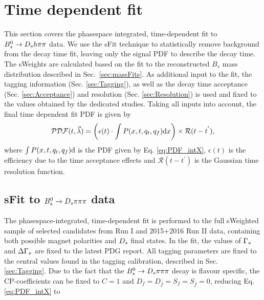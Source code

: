 \section{Time dependent fit}
\label{sec:Tfit}

This section covers the phasespace integrated, time-dependent fit to ${{B}^0_{s}}\rightarrow{\ensuremath{{D}_{s}}}{\ensuremath{h}}{\ensuremath{\pi}}{\ensuremath{\pi}}$ data.
We use the \textsf{sFit} technique \cite{Pivk:2004ty}  to statistically remove background from the decay time fit, leaving only the signal PDF to describe the decay time. 
The \textsf{sWeights} are calculated based on the fit to the reconstructed $B_s$ mass distribution described in Sec.~\ref{sec:massFits}.
As additional input to the fit, the tagging information (Sec. \ref{sec:Tagging}), 
as well as the decay time acceptance (Sec. \ref{sec:Acceptance}) and resolution (Sec. \ref{sec:Resolution}) is used and fixed to the values obtained by the dedicated studies. 
Taking all inputs into account, the final time dependent fit PDF is given by
\begin{equation}
\label{eq:TPDF_full}
\mathcal{PDF}(t,\vec{\lambda}) = \left(\epsilon(t)\cdot \int P(x,t,q_t,q_f) \text d x \right) \times \mathcal{R}(t - t^{'}),
\end{equation}
where $\int P(x,t,q_t,q_f) \text d$ is the PDF given by Eq. \ref{eq:PDF_intX}, $\epsilon(t)$ is the efficiency due to the time acceptance effects and $\mathcal{R}(t - t^{'})$ is the Gaussian time resolution function. 



\subsection{sFit to ${{B}^0_{s}}\rightarrow{\ensuremath{{D}_{s}}}{\ensuremath{\pi}}{\ensuremath{\pi}}{\ensuremath{\pi}}$ data}  
The phasespace-integrated, time-dependent fit is performed to the full sWeighted sample of selected candidates from Run I and 2015+2016 Run II data, containing both possible magnet polarities and ${{D}_{s}}$ final states.
In the fit, the values of ${\Gamma_{{s}}}$ and ${\Delta\Gamma_{{s}}}$ are fixed to the latest PDG report. All tagging parameters are fixed to the central values found in the tagging calibration, described in Sec. \ref{sec:Tagging}.
Due to the fact that the ${{B}^0_{s}}\rightarrow{\ensuremath{{D}_{s}}}{\ensuremath{\pi}}{\ensuremath{\pi}}{\ensuremath{\pi}}$ decay is flavour specific, the CP-coefficients can be fixed to $C=1$ and $D_{f} = D_{\bar{f}} = S_{f} = S_{\bar{f}} = 0$, reducing Eq. \ref{eq:PDF_intX} to

